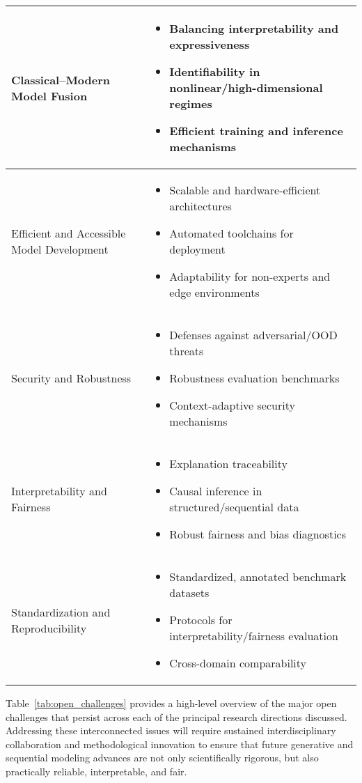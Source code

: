 \documentclass[11pt]{article}
\begin{document}
\begin{table}[htbp]
\begin{tabular}{|p{4cm}|p{8.5cm}|}
\hline
Classical--Modern Model Fusion &
\begin{itemize}
    \item Balancing interpretability and expressiveness
    \item Identifiability in nonlinear/high-dimensional regimes
    \item Efficient training and inference mechanisms
\end{itemize} \\
\hline
Efficient and Accessible Model Development &
\begin{itemize}
    \item Scalable and hardware-efficient architectures
    \item Automated toolchains for deployment
    \item Adaptability for non-experts and edge environments
\end{itemize} \\
\hline
Security and Robustness &
\begin{itemize}
    \item Defenses against adversarial/OOD threats
    \item Robustness evaluation benchmarks
    \item Context-adaptive security mechanisms
\end{itemize} \\
\hline
Interpretability and Fairness &
\begin{itemize}
    \item Explanation traceability
    \item Causal inference in structured/sequential data
    \item Robust fairness and bias diagnostics
\end{itemize} \\
\hline
Standardization and Reproducibility &
\begin{itemize}
    \item Standardized, annotated benchmark datasets
    \item Protocols for interpretability/fairness evaluation
    \item Cross-domain comparability
\end{itemize} \\
\hline
\end{tabular}
\end{table}

Table~\ref{tab:open_challenges} provides a high-level overview of the major open challenges that persist across each of the principal research directions discussed. Addressing these interconnected issues will require sustained interdisciplinary collaboration and methodological innovation to ensure that future generative and sequential modeling advances are not only scientifically rigorous, but also practically reliable, interpretable, and fair.
\end{document}

